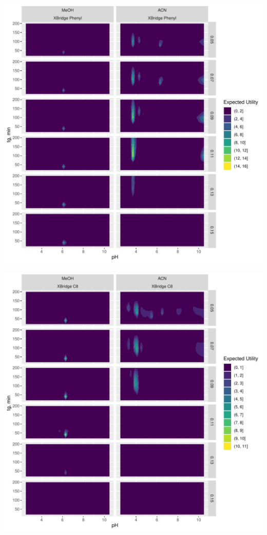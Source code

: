 \documentclass[
]{article}
\begin{document}
\newpage{}

\includegraphics{../figures/casestudy1/utilitymap/utilitymap3.pdf}

\newpage{}

\includegraphics{../figures/casestudy1/utilitymap/utilitymap4.pdf}
\end{document}
